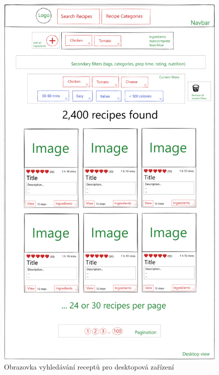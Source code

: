 \begin{figure}[p]\centering
\includegraphics[width=140mm]{../img/desktop-search-view}
\caption{Obrazovka vyhledávání receptů pro desktopová zařízení}
\label{obr01:desktop-search-view}
\end{figure}

